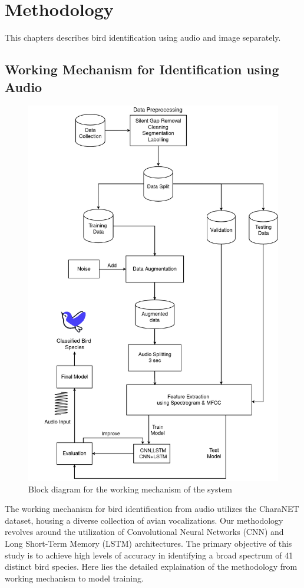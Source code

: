 \chapter{Methodology}
This chapters describes bird identification using audio and image separately.
\section{Working Mechanism for Identification using Audio}
\begin{figure}[h!]
    \centering
    \includegraphics[scale=0.33]{images/Methodology1.png}
    \caption{Block diagram for the working mechanism of the
        system}%
\end{figure}
\newpage
The working mechanism for bird identification from audio utilizes the CharaNET
dataset,
housing a diverse collection of avian vocalizations. Our methodology revolves
around the
utilization of Convolutional Neural Networks (CNN) and Long Short-Term Memory
(LSTM) architectures.
The primary objective of this study is to achieve high levels of accuracy in
identifying a
broad spectrum of 41 distinct bird species. Here lies the detailed explaination
of the methodology
from working mechanism to model training.
